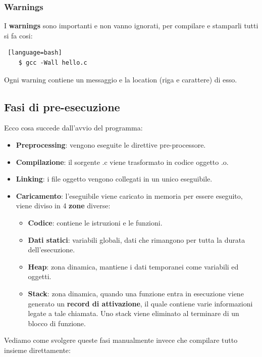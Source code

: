 \documentclass[12pt,a4paper]{article}
\begin{document}
\subsubsection{Warnings}
I \textbf{warnings} sono importanti e non vanno ignorati, per compilare e stamparli tutti si fa cosi:
\begin{lstlisting} [language=bash]
    $ gcc -Wall hello.c
\end{lstlisting}
Ogni warning contiene un messaggio e la location (riga e carattere) di esso.
\subsection{Fasi di pre-esecuzione}
Ecco cosa succede dall'avvio del programma:
\begin{itemize}
    \item \textbf{Preprocessing}: vengono eseguite le direttive pre-processore.
    \item \textbf{Compilazione}: il sorgente .c viene trasformato in codice oggetto .o.
    \item \textbf{Linking}: i file oggetto vengono collegati in un unico eseguibile.
    \item \textbf{Caricamento}: l'eseguibile viene caricato in memoria per essere eseguito, viene diviso in 4 \textbf{zone} diverse:
    \begin{itemize}
        \item \textbf{Codice}: contiene le istruzioni e le funzioni.
        \item \textbf{Dati statici}: variabili globali, dati che rimangono per tutta la durata dell'esecuzione.
        \item \textbf{Heap}: zona dinamica, mantiene i dati temporanei come variabili ed oggetti.
        \item \textbf{Stack}: zona dinamica, quando una funzione entra in esecuzione viene generato un \textbf{record di attivazione}, il quale contiene varie informazioni legate a tale chiamata. Uno stack viene eliminato al terminare di un blocco di funzione.
    \end{itemize}
\end{itemize}
Vediamo come svolgere queste fasi manualmente invece che compilare tutto insieme direttamente:
\end{document}

